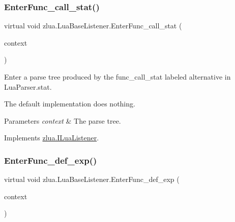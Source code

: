 \subsubsection{\texorpdfstring{Enter\+Func\+\_\+call\+\_\+stat()}{EnterFunc\_call\_stat()}}
{\footnotesize\ttfamily virtual void zlua.\+Lua\+Base\+Listener.\+Enter\+Func\+\_\+call\+\_\+stat (\begin{DoxyParamCaption}\item[{\mbox{[}\+Not\+Null\mbox{]} \mbox{\hyperlink{classzlua_1_1_lua_parser_1_1_func__call__stat_context}{Lua\+Parser.\+Func\+\_\+call\+\_\+stat\+Context}}}]{context }\end{DoxyParamCaption})\hspace{0.3cm}{\ttfamily [virtual]}}



Enter a parse tree produced by the {\ttfamily func\+\_\+call\+\_\+stat} labeled alternative in Lua\+Parser.\+stat. 

The default implementation does nothing.


\begin{DoxyParams}{Parameters}
{\em context} & The parse tree.\\
\hline
\end{DoxyParams}


Implements \mbox{\hyperlink{interfacezlua_1_1_i_lua_listener_a082ec71bf7dc3bee6dd365c9a56ee59c}{zlua.\+I\+Lua\+Listener}}.

\mbox{\label{classzlua_1_1_lua_base_listener_ace1992dcf21cf3eff2428f67de5f3595}} 
\subsubsection{\texorpdfstring{Enter\+Func\+\_\+def\+\_\+exp()}{EnterFunc\_def\_exp()}}
{\footnotesize\ttfamily virtual void zlua.\+Lua\+Base\+Listener.\+Enter\+Func\+\_\+def\+\_\+exp (\begin{DoxyParamCaption}\item[{\mbox{[}\+Not\+Null\mbox{]} \mbox{\hyperlink{classzlua_1_1_lua_parser_1_1_func__def__exp_context}{Lua\+Parser.\+Func\+\_\+def\+\_\+exp\+Context}}}]{context }\end{DoxyParamCaption})\hspace{0.3cm}{\ttfamily [virtual]}}



